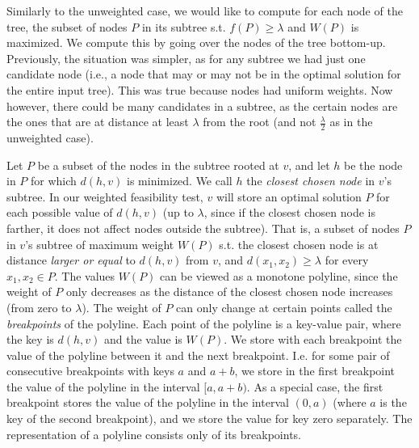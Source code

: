 \documentclass[a4paper,UKenglish]{lipics-v2016}
\theoremstyle{plain}
\begin{document}
Similarly to the unweighted case, we would like to compute for each node of the tree, the subset of nodes $P$ in its subtree  s.t. $f(P) \geq \lambda$ and $W(P)$ is maximized. We compute this by going over the nodes of the tree bottom-up. Previously, the situation was simpler, as for any subtree we had just one candidate node (i.e., a node that may or may not be in the optimal solution for the entire input tree). This was true because nodes had uniform weights. Now however, there could be many candidates in a subtree, as the certain nodes are the ones that are at distance at least $\lambda$ from the root (and not $\frac{\lambda}{2}$ as in the unweighted case).

Let $P$ be a subset of the nodes in the subtree rooted at $v$, and let $h$ be the node in $P$ for which $d(h,v)$ is minimized. We call $h$ the {\em closest chosen node} in $v$'s subtree. In our weighted feasibility test, $v$ will store an optimal solution $P$ for each possible value of $d(h,v)$ (up to $\lambda$, since if the closest chosen node is farther, it does not affect nodes outside the subtree). That is, a subset of nodes $P$ in $v$'s subtree of maximum weight $W(P)$ s.t. the closest chosen node is at distance {\em larger or equal} to $d(h,v)$ from $v$, and $d(x_1,x_2) \geq \lambda$ for every  $x_1,x_2\in P$. 
The values $W(P)$ can be viewed as a monotone polyline, since the weight of $P$ only decreases as the distance of the closest chosen node increases (from zero to $\lambda$). The weight of $P$ can only change at certain points called the {\em breakpoints} of the polyline. Each point of the polyline is a key-value pair, where the key is $d(h,v)$ and the value is $W(P)$. We store with each breakpoint the value of the polyline between it and the next breakpoint. I.e. for some pair of consecutive breakpoints with keys $a$ and $a+b$, we store in the first breakpoint the value of the polyline in the interval $[a,a+b)$. As a special case, the first breakpoint stores the value of the polyline in the interval $(0,a)$ (where $a$ is the key of the second breakpoint), and we store the value for key zero separately. The representation of a polyline consists only of its breakpoints.

\end{document}
